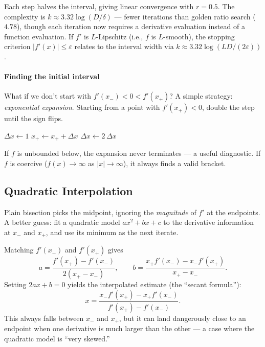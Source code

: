 Each step halves the interval, giving linear convergence with $r = 0.5$.
The complexity is $k \approx 3.32 \log(D / \delta)$ --- fewer iterations than golden ratio search ($4.78$), though each iteration now requires a derivative evaluation instead of a function evaluation.
If $f'$ is $L$-Lipschitz (i.e., $f$ is $L$-smooth), the stopping criterion $|f'(x)| \leq \varepsilon$ relates to the interval width via $k \approx 3.32 \log(LD / (2\varepsilon))$.

\paragraph{Finding the initial interval}

What if we don't start with $f'(x_-) < 0 < f'(x_+)$?
A simple strategy: \textit{exponential expansion}.
Starting from a point with $f'(x_+) < 0$, double the step until the sign flips.

\begin{algorithm}
	\caption{Exponential Interval Expansion}
	\begin{algorithmic}[1]
		\State $\Delta x \gets 1$
			\State $x_+ \gets x_+ + \Delta x$
			\State $\Delta x \gets 2\, \Delta x$ 
		\EndWhile
	\end{algorithmic}
\end{algorithm}

If $f$ is unbounded below, the expansion never terminates --- a useful diagnostic.
If $f$ is coercive ($f(x) \to \infty$ as $|x| \to \infty$), it always finds a valid bracket.


\subsection{Quadratic Interpolation}\label{ssec:quad-interpolation}

Plain bisection picks the midpoint, ignoring the \emph{magnitude} of $f'$ at the endpoints.
A better guess: fit a quadratic model $ax^2 + bx + c$ to the derivative information at $x_-$ and $x_+$, and use its minimum as the next iterate.

Matching $f'(x_-)$ and $f'(x_+)$ gives
\begin{equation}\label{eq:quad-interp-coefficients}
	a = \frac{f'(x_+) - f'(x_-)}{2(x_+ - x_-)},
	\qquad
	b = \frac{x_+ f'(x_-) - x_- f'(x_+)}{x_+ - x_-}.
\end{equation}
Setting $2ax + b = 0$ yields the interpolated estimate (the ``secant formula''):
\begin{equation}\label{eq:secant-formula}
	x = \frac{x_- f'(x_+) - x_+ f'(x_-)}{f'(x_+) - f'(x_-)}.
\end{equation}
This always falls between $x_-$ and $x_+$, but it can land dangerously close to an endpoint when one derivative is much larger than the other --- a case where the quadratic model is ``very skewed.''

